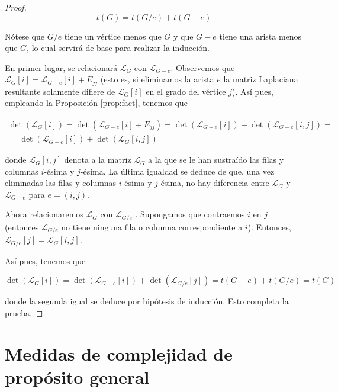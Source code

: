 \begin{proof}
\begin{equation}
t(G) = t(G/e) + t(G-e)
\end{equation}

Nótese que $G/e$ tiene un vértice menos que $G$ y que $G-e$ tiene una arista menos que $G$, lo cual servirá de base para realizar la inducción.

En primer lugar, se relacionará $\mathcal{L}_G$ con $\mathcal{L}_{G-e}$. Observemos que $\mathcal{L}_G[i] = \mathcal{L}_{G-e}[i] + E_{jj}$ (esto es, si eliminamos la arista $e$ la matriz Laplaciana resultante solamente difiere de $\mathcal{L}_G[i]$ en el grado del vértice $j$). Así pues, empleando la Proposición \ref{prop:fact}, tenemos que

\begin{equation}
\begin{split}
\det(\mathcal{L}_G[i]) = \det(\mathcal{L}_{G-e}[i] + E_{jj}) = \det(\mathcal{L}_{G-e}[i]) + \det(\mathcal{L}_{G-e}[i,j]) = \\ = \det(\mathcal{L}_{G-e}[i]) + \det(\mathcal{L}_G[i,j])
\end{split}
\end{equation} 

donde $\mathcal{L}_G[i,j]$ denota a la matriz $\mathcal{L}_G$ a la que se le han sustraído las filas y columnas $i$-ésima y $j$-ésima. La última igualdad se deduce de que, una vez eliminadas las filas y columnas $i$-ésima y $j$-ésima, no hay diferencia entre $\mathcal{L}_G$ y $\mathcal{L}_{G-e}$ para $e = (i, j)$.

Ahora relacionaremos $\mathcal{L}_G$ con $\mathcal{L}_{G/e}$ . Supongamos que contraemos $i$ en $j$ (entonces $\mathcal{L}_{G/e}$ no tiene ninguna fila o columna correspondiente a $i$). Entonces, $\mathcal{L}_{G/e}[j] = \mathcal{L}_G[i,j]$.

Así pues, tenemos que

\begin{equation}
\det(\mathcal{L}_G[i]) = \det(\mathcal{L}_{G-e}[i]) + \det(\mathcal{L}_{G/e}[j]) = t(G-e)+t(G/e) = t(G)
\end{equation}

donde la segunda igual se deduce por hipótesis de inducción. Esto completa la prueba.
\end{proof}

\section{Medidas de complejidad de propósito general}\label{sec:complexity}

